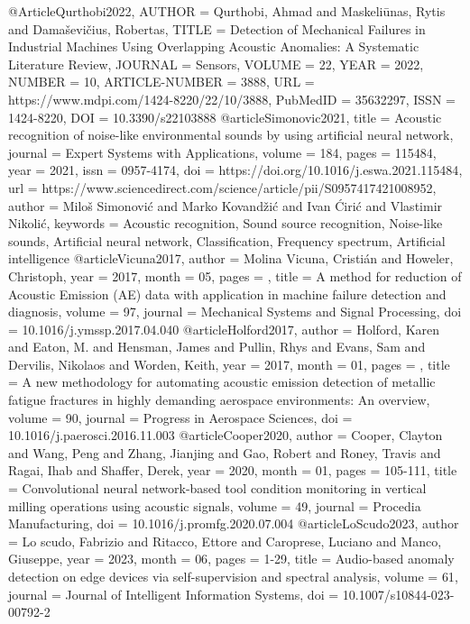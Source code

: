 @Article{Qurthobi2022,
    AUTHOR = {Qurthobi, Ahmad and Maskeliūnas, Rytis and Damaševičius, Robertas},
    TITLE = {Detection of Mechanical Failures in Industrial Machines Using Overlapping Acoustic Anomalies: A Systematic Literature Review},
    JOURNAL = {Sensors},
    VOLUME = {22},
    YEAR = {2022},
    NUMBER = {10},
    ARTICLE-NUMBER = {3888},
    URL = {https://www.mdpi.com/1424-8220/22/10/3888},
    PubMedID = {35632297},
    ISSN = {1424-8220},
    DOI = {10.3390/s22103888}
}%
@article{Simonovic2021,
    title = {Acoustic recognition of noise-like environmental sounds by using artificial neural network},
    journal = {Expert Systems with Applications},
    volume = {184},
    pages = {115484},
    year = {2021},
    issn = {0957-4174},
    doi = {https://doi.org/10.1016/j.eswa.2021.115484},
    url = {https://www.sciencedirect.com/science/article/pii/S0957417421008952},
    author = {Miloš Simonović and Marko Kovandžić and Ivan Ćirić and Vlastimir Nikolić},
    keywords = {Acoustic recognition, Sound source recognition, Noise-like sounds, Artificial neural network, Classification, Frequency spectrum, Artificial intelligence}
}%
@article{Vicuna2017,
    author = {Molina Vicuna, Cristián and Howeler, Christoph},
    year = {2017},
    month = {05},
    pages = {},
    title = {A method for reduction of Acoustic Emission (AE) data with application in machine failure detection and diagnosis},
    volume = {97},
    journal = {Mechanical Systems and Signal Processing},
    doi = {10.1016/j.ymssp.2017.04.040}
}%
@article{Holford2017,
    author = {Holford, Karen and Eaton, M. and Hensman, James and Pullin, Rhys and Evans, Sam and Dervilis, Nikolaos and Worden, Keith},
    year = {2017},
    month = {01},
    pages = {},
    title = {A new methodology for automating acoustic emission detection of metallic fatigue fractures in highly demanding aerospace environments: An overview},
    volume = {90},
    journal = {Progress in Aerospace Sciences},
    doi = {10.1016/j.paerosci.2016.11.003}
}%
@article{Cooper2020,
    author = {Cooper, Clayton and Wang, Peng and Zhang, Jianjing and Gao, Robert and Roney, Travis and Ragai, Ihab and Shaffer, Derek},
    year = {2020},
    month = {01},
    pages = {105-111},
    title = {Convolutional neural network-based tool condition monitoring in vertical milling operations using acoustic signals},
    volume = {49},
    journal = {Procedia Manufacturing},
    doi = {10.1016/j.promfg.2020.07.004}
}%
@article{LoScudo2023,
author = {Lo scudo, Fabrizio and Ritacco, Ettore and Caroprese, Luciano and Manco, Giuseppe},
year = {2023},
month = {06},
pages = {1-29},
title = {Audio-based anomaly detection on edge devices via self-supervision and spectral analysis},
volume = {61},
journal = {Journal of Intelligent Information Systems},
doi = {10.1007/s10844-023-00792-2}
}%
